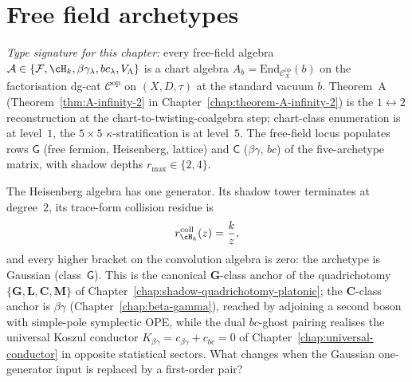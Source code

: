 
\chapter{Free field archetypes}\label{chap:free-fields}

\noindent
\emph{Type signature for this chapter:} every free-field algebra
$\mathcal A\in\{\mathcal F, \cH_k, \beta\gamma_\lambda, bc_\lambda,
V_\Lambda\}$ is a chart algebra
$A_b=\mathrm{End}_{\mathcal{C}^{\mathrm{op}}_X}(b)$ on the
factorisation dg-cat $\mathcal{C}^{\mathrm{op}}$ on $(X, D, \tau)$
at the standard vacuum $b$. Theorem~A
(Theorem~\ref{thm:A-infinity-2} in
Chapter~\ref{chap:theorem-A-infinity-2}) is the $1\!\leftrightarrow\!2$
reconstruction at the chart-to-twisting-coalgebra step;
chart-class enumeration is at level~$1$, the $5\times 5$
$\kappa$-stratification is at level~$5$. The free-field locus
populates rows $\mathsf{G}$ (free fermion, Heisenberg, lattice)
and $\mathsf{C}$ ($\beta\gamma$, $bc$) of the five-archetype matrix,
with shadow depths $r_{\max}\in\{2,4\}$.

The Heisenberg algebra has one generator. Its shadow tower
terminates at degree~$2$, its trace-form collision residue is
\[
r_{\cH_k}^{\mathrm{coll}}(z)=\frac{k}{z},
\]
and every higher bracket on the convolution algebra is zero: the
archetype is Gaussian (class~$\mathsf{G}$).
This is the canonical $\mathbf{G}$-class anchor of the
quadrichotomy
$\{\mathbf{G},\mathbf{L},\mathbf{C},\mathbf{M}\}$ of
Chapter~\ref{chap:shadow-quadrichotomy-platonic}; the
$\mathbf{C}$-class anchor is $\beta\gamma$
(Chapter~\ref{chap:beta-gamma}), reached by adjoining a second
boson with simple-pole symplectic OPE, while the dual $bc$-ghost
pairing realises the universal Koszul conductor
$K_{\beta\gamma} = c_{\beta\gamma} + c_{bc} = 0$ of
Chapter~\ref{chap:universal-conductor} in opposite statistical
sectors. What changes when the Gaussian one-generator input is
replaced by a first-order pair?

